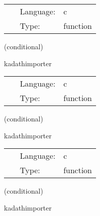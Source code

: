 \hspace{5mm}{\it check parameters } 


\hspace{5mm}

 \begin{tabular*}{160mm}{cll} 
~ & Language:  & c \\ 
~ & Type:  & function \\ 
\end{tabular*} 


\vspace{5mm}

   (conditional) 

\hspace{5mm} kadathimporter 

\hspace{5mm}{\it set up binary black hole initial data } 


\hspace{5mm}

 \begin{tabular*}{160mm}{cll} 
~ & Language:  & c \\ 
~ & Type:  & function \\ 
\end{tabular*} 


\vspace{5mm}

   (conditional) 

\hspace{5mm} kadathimporter 

\hspace{5mm}{\it set up black hole initial data } 


\hspace{5mm}

 \begin{tabular*}{160mm}{cll} 
~ & Language:  & c \\ 
~ & Type:  & function \\ 
\end{tabular*} 


\vspace{5mm}

   (conditional) 

\hspace{5mm} kadathimporter 

\hspace{5mm}{\it set up binary neutron star initial data } 


